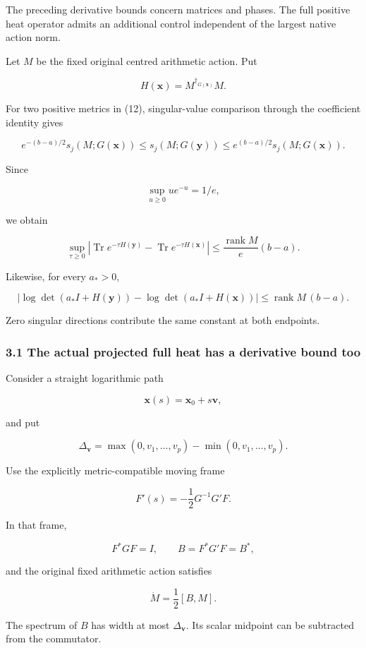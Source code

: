 \documentclass[11pt]{article}
\begin{document}
The preceding derivative bounds concern matrices and phases. The full positive heat operator admits an additional control independent of the largest native action norm.

Let \(M\) be the fixed original centred arithmetic action. Put

\[
H(\mathbf x)=M^{\dagger_{G(\mathbf x)}}M.
\]

For two positive metrics in (12), singular-value comparison through the coefficient identity gives

\[
e^{-(b-a)/2}s_j(M;G(\mathbf x))
\le
s_j(M;G(\mathbf y))
\le
e^{(b-a)/2}s_j(M;G(\mathbf x)).
\]

Since

\[
\sup_{u\ge0}ue^{-u}=1/e,
\]

we obtain

\[
\boxed{
\sup_{\tau\ge0}
\left|
\operatorname{Tr}e^{-\tau H(\mathbf y)}
-\operatorname{Tr}e^{-\tau H(\mathbf x)}
\right|
\le
\frac{\operatorname{rank}M}{e}(b-a).
}
\tag{18}
\]

Likewise, for every \(a_*>0\),

\[
\boxed{
\left|
\log\det(a_*I+H(\mathbf y))
-\log\det(a_*I+H(\mathbf x))
\right|
\le
\operatorname{rank}M\,(b-a).
}
\tag{19}
\]

Zero singular directions contribute the same constant at both endpoints.

\subsubsection{3.1 The actual projected full heat has a derivative bound too}\label{the-actual-projected-full-heat-has-a-derivative-bound-too}

Consider a straight logarithmic path

\[
\mathbf x(s)=\mathbf x_0+s\mathbf v,
\]

and put

\[
\Delta_{\mathbf v}
=
\max(0,v_1,\ldots,v_p)-\min(0,v_1,\ldots,v_p).
\]

Use the explicitly metric-compatible moving frame

\[
F'(s)=-\frac12G^{-1}G'F.
\]

In that frame,

\[
F^*GF=I,\qquad
B=F^*G'F=B^*,
\]

and the original fixed arithmetic action satisfies

\[
\dot M=\frac12[B,M].
\]

The spectrum of \(B\) has width at most \(\Delta_{\mathbf v}\). Its scalar midpoint can be subtracted from the commutator.
\end{document}
